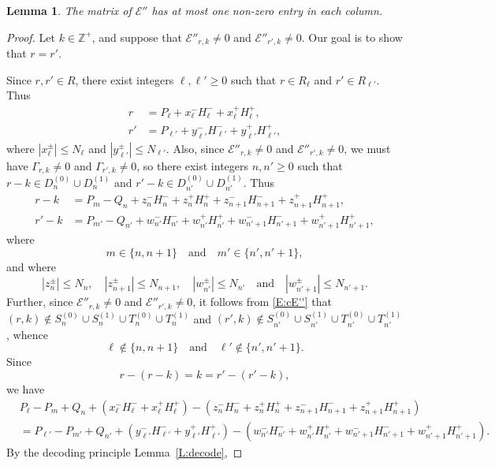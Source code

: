 \documentclass[11pt,reqno]{amsart}
\theoremstyle{plain}
\newtheorem{lemma}[theorem]{Lemma}
\theoremstyle{definition}
\theoremstyle{remark}
\newcommand{\cE}{\mathcal{E}}
\newcommand{\ZZ}{\mathbb{Z}}
\begin{document}
\begin{lemma}\label{L:column}
The matrix of $\cE''$ has at most one non-zero entry in each column.
\end{lemma}

\begin{proof}
Let $k\in\ZZ^+$, and suppose that $\cE''_{r,k}\ne0$ and $\cE''_{r',k}\ne0$. Our goal is to show that $r=r'$.

Since $r,r'\in R$, there exist integers $\ell,\ell'\ge0$ such that
$r\in R_\ell$ and $r'\in R_{\ell'}$. Thus
\begin{align*}
r&=P_\ell+x_\ell^-H_\ell^-+x_\ell^+H_\ell^+,\\
r'&=P_{\ell'}+y_{\ell'}^-H_{\ell'}^-+y_{\ell'}^+H_{\ell'}^+,
\end{align*}
where $|x_\ell^\pm|\le N_\ell$ and  $|y_{\ell'}^\pm|\le N_{\ell'}$.
Also, since $\cE''_{r,k}\ne0$ and $\cE''_{r',k}\ne0$,
we must have $\Gamma_{r,k}\ne0$ and $\Gamma_{r',k}\ne0$,
so there exist integers $n,n'\ge0$ such that $r-k\in D_n^{(0)}\cup D_n^{(1)}$ and $r'-k\in D_{n'}^{(0)}\cup D_{n'}^{(1)}$.
Thus 
\begin{align*}
r-k&=P_m-Q_n+z_n^-H_n^-+z_n^+H_n^++z_{n+1}^-H_{n+1}^-+z_{n+1}^+H_{n+1}^+,\\
r'-k&=P_{m'}-Q_{n'}+w_{n'}^-H_{n'}^-+w_{n'}^+H_{n'}^++w_{n'+1}^-H_{n'+1}^-+w_{n'+1}^+H_{n'+1}^+,
\end{align*} 
where 
\[
m\in\{n,n+1\}
\quad\text{and}\quad
m'\in\{n',n'+1\},
\]
and where
\[
|z_n^\pm|\le N_n, \quad |z_{n+1}^\pm|\le N_{n+1},
\quad |w_{n'}^\pm|\le N_{n'}\quad\text{and}\quad 
 |w_{n'+1}^\pm|\le N_{n'+1}.
\]
Further,
since $\cE''_{r,k}\ne0$ and $\cE''_{r',k}\ne0$,
it follows from \eqref{E:cE''} that 
$(r,k)\notin S_n^{(0)}\cup S_n^{(1)}\cup T_n^{(0)}\cup T_n^{(1)}$
and $(r',k)\notin S_{n'}^{(0)}\cup S_{n'}^{(1)}\cup T_{n'}^{(0)}\cup T_{n'}^{(1)}$,
whence 
\[
\ell\notin\{n,n+1\} 
\quad\text{and}\quad 
\ell'\notin\{n',n'+1\}.
\]
Since 
\[
r-(r-k)=k=r'-(r'-k),
\]
we have
\begin{equation}\label{E:bigeqn}
\begin{aligned}
&P_\ell-P_m+Q_n+(x_\ell^-H_\ell^-+x_\ell^+H_\ell^+)-
(z_n^-H_n^-+z_n^+H_n^++z_{n+1}^-H_{n+1}^-+z_{n+1}^+H_{n+1}^+)\\
&=P_{\ell'}-P_{m'}+Q_{n'}+(y_{\ell'}^-H_{\ell'}^-+y_{\ell'}^+H_{\ell'}^+)-
(w_{n'}^-H_{n'}^-+w_{n'}^+H_{n'}^++w_{n'+1}^-H_{n'+1}^-+w_{n'+1}^+H_{n'+1}^+).
\end{aligned}
\end{equation}
By the decoding principle Lemma~\ref{L:decode},

\end{proof}
\end{document}
